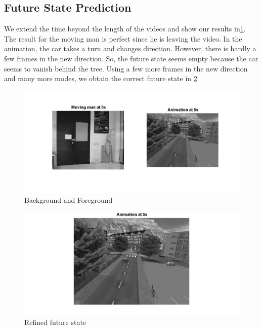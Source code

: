 \documentclass[a4paper]{article}
\begin{document}
\subsection{Future State Prediction}

We extend the time beyond the length of the videos and show our results in\ref{F:fut}. The result for the moving man is perfect since he is leaving the video. In the animation, the car takes a turn and changes direction. However, there is hardly a few frames in the new direction. So, the future state seems empty because the car seems to vanish behind the tree. Using a few more frames in the new direction and many more modes, we obtain the correct future state in \ref{F:futr}

\begin{figure}[h!] 
	\begin{centering} 
		\includegraphics[width=1.1\textwidth]{future}
	\end{centering}
	\caption{Background and Foreground \label{F:fut}}	
\end{figure}

\begin{figure}[h!] 
	\begin{centering} 
		\begin{center}
			
		\includegraphics[width=1\textwidth]{futr}
		\end{center}		
	\end{centering}
	\caption{Refined future state \label{F:futr}}	
\end{figure}
\end{document}
